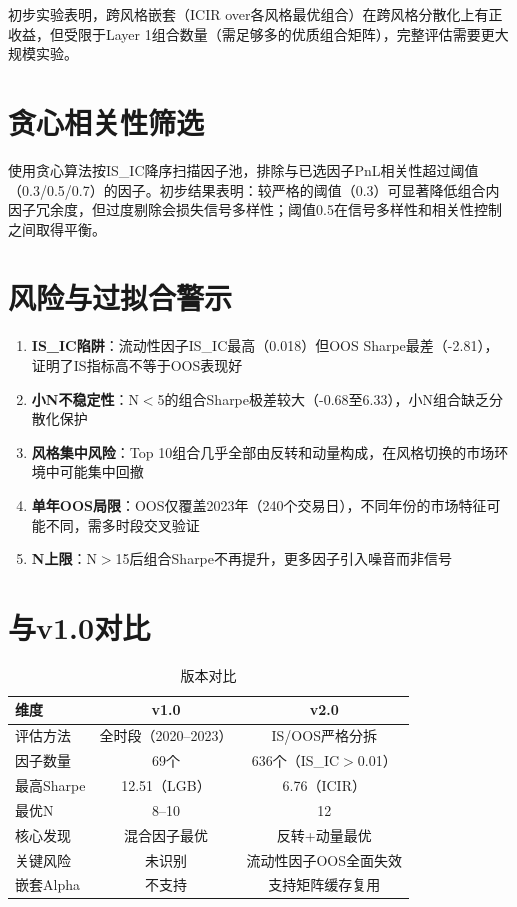 \documentclass[11pt,a4paper]{ctexart}
\begin{document}
初步实验表明，跨风格嵌套（ICIR over各风格最优组合）在跨风格分散化上有正收益，但受限于Layer 1组合数量（需足够多的优质组合矩阵），完整评估需要更大规模实验。

\section{贪心相关性筛选}

使用贪心算法按IS\_IC降序扫描因子池，排除与已选因子PnL相关性超过阈值（0.3/0.5/0.7）的因子。初步结果表明：较严格的阈值（0.3）可显著降低组合内因子冗余度，但过度剔除会损失信号多样性；阈值0.5在信号多样性和相关性控制之间取得平衡。

\section{风险与过拟合警示}

\begin{enumerate}[nosep]
    \item \textbf{IS\_IC陷阱}：流动性因子IS\_IC最高（0.018）但OOS Sharpe最差（-2.81），证明了IS指标高不等于OOS表现好
    \item \textbf{小N不稳定性}：N$<$5的组合Sharpe极差较大（-0.68至6.33），小N组合缺乏分散化保护
    \item \textbf{风格集中风险}：Top 10组合几乎全部由反转和动量构成，在风格切换的市场环境中可能集中回撤
    \item \textbf{单年OOS局限}：OOS仅覆盖2023年（240个交易日），不同年份的市场特征可能不同，需多时段交叉验证
    \item \textbf{N上限}：N$>$15后组合Sharpe不再提升，更多因子引入噪音而非信号
\end{enumerate}

\section{与v1.0对比}

\begin{table}[H]
\centering
\caption{版本对比}
\begin{tabular}{lcc}
\toprule
\textbf{维度} & \textbf{v1.0} & \textbf{v2.0} \\
\midrule
评估方法       & 全时段（2020--2023） & IS/OOS严格分拆 \\
因子数量       & 69个                & 636个（IS\_IC$>$0.01） \\
最高Sharpe     & 12.51（LGB）        & 6.76（ICIR） \\
最优N          & 8--10               & 12 \\
核心发现       & 混合因子最优        & 反转+动量最优 \\
关键风险       & 未识别              & 流动性因子OOS全面失效 \\
嵌套Alpha      & 不支持              & 支持矩阵缓存复用 \\
\bottomrule
\end{tabular}
\end{table}
\end{document}
